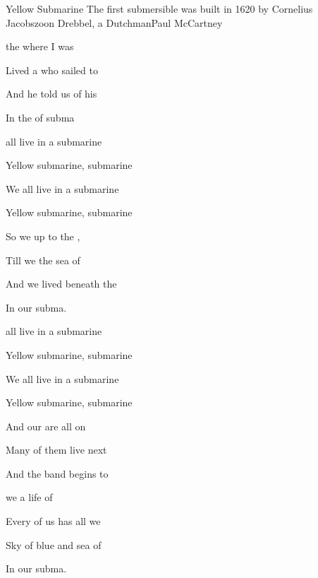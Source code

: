 \begin{SBSong}{Yellow Submarine}
  {The first submersible was built in 1620 by Cornelius Jacobszoon Drebbel, a Dutchman}{Paul McCartney}
  \begin{SBVerse}
     the  where I was 

   Lived a  who sailed to 

    And he told us of his 

    In the  of subma
   \end{SBVerse}
   \begin{SBChorus}
     all live in a  submarine

    Yellow submarine,  submarine

    We all live in a  submarine

    Yellow submarine,  submarine
  \end{SBChorus}
  \begin{SBVerse}
     So we  up to the ,

    Till we  the sea of 

    And we lived beneath the 

    In our  subma.
  \end{SBVerse}
  \begin{SBChorus}
    all live in a  submarine

    Yellow submarine,  submarine

    We all live in a  submarine

    Yellow submarine,  submarine 
  \end{SBChorus}
  \begin{SBVerse}
    And our  are all on 
    
    Many  of them live next 
    
    And the band begins to  
  \end{SBVerse}
  \SBDirection{**************}
  \begin{SBVerse}
     we  a life of 
    
    Every of us has all we 
    
    Sky of blue and sea of 
    
    In our  subma.
  \end{SBVerse}
\end{SBSong}
